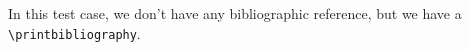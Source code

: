 \documentclass{article}
\begin{document}
\noindent  In  this  test  case,   we  don't  have  any  bibliographic
reference, but we have a \verb+\printbibliography+.

\printbibliography
\end{document}
